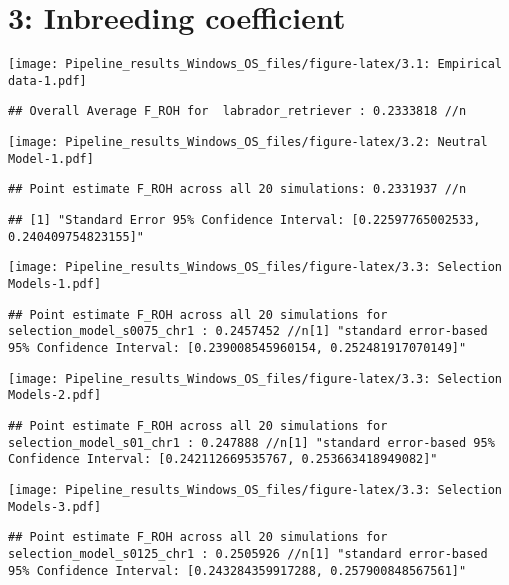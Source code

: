 \documentclass[
]{article}
\begin{document}
\section{3: Inbreeding coefficient}\label{inbreeding-coefficient}

\texttt{[image: Pipeline\_results\_Windows\_OS\_files/figure-latex/3.1: Empirical data-1.pdf]}

\begin{verbatim}
## Overall Average F_ROH for  labrador_retriever : 0.2333818 //n
\end{verbatim}

\texttt{[image: Pipeline\_results\_Windows\_OS\_files/figure-latex/3.2: Neutral Model-1.pdf]}

\begin{verbatim}
## Point estimate F_ROH across all 20 simulations: 0.2331937 //n
\end{verbatim}

\begin{verbatim}
## [1] "Standard Error 95% Confidence Interval: [0.22597765002533, 0.240409754823155]"
\end{verbatim}

\texttt{[image: Pipeline\_results\_Windows\_OS\_files/figure-latex/3.3: Selection Models-1.pdf]}

\begin{verbatim}
## Point estimate F_ROH across all 20 simulations for  selection_model_s0075_chr1 : 0.2457452 //n[1] "standard error-based 95% Confidence Interval: [0.239008545960154, 0.252481917070149]"
\end{verbatim}

\texttt{[image: Pipeline\_results\_Windows\_OS\_files/figure-latex/3.3: Selection Models-2.pdf]}

\begin{verbatim}
## Point estimate F_ROH across all 20 simulations for  selection_model_s01_chr1 : 0.247888 //n[1] "standard error-based 95% Confidence Interval: [0.242112669535767, 0.253663418949082]"
\end{verbatim}

\texttt{[image: Pipeline\_results\_Windows\_OS\_files/figure-latex/3.3: Selection Models-3.pdf]}

\begin{verbatim}
## Point estimate F_ROH across all 20 simulations for  selection_model_s0125_chr1 : 0.2505926 //n[1] "standard error-based 95% Confidence Interval: [0.243284359917288, 0.257900848567561]"
\end{verbatim}
\end{document}

